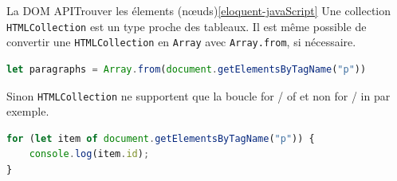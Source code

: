 \documentclass{beamer}
\begin{document}
    \begin{frame}[fragile]{La DOM API}{Trouver les élements (nœuds)\cref{eloquent-javaScript}}
        Une collection \lstinline{HTMLCollection} est un type proche des tableaux.
        Il est même possible de convertir une \lstinline{HTMLCollection} en \lstinline{Array} avec \lstinline{Array.from}, si nécessaire.
        \begin{lstlisting}[language=JavaScript,title={\tiny{Script JavaScript}}]
let paragraphs = Array.from(document.getElementsByTagName("p"))
        \end{lstlisting}
        Sinon \lstinline{HTMLCollection} ne supportent que la boucle for / of et non for / in par exemple.
        \begin{lstlisting}[language=JavaScript,title={\tiny{Script JavaScript}}]
for (let item of document.getElementsByTagName("p")) {
    console.log(item.id);
}
        \end{lstlisting}
    \end{frame}
\end{document}
